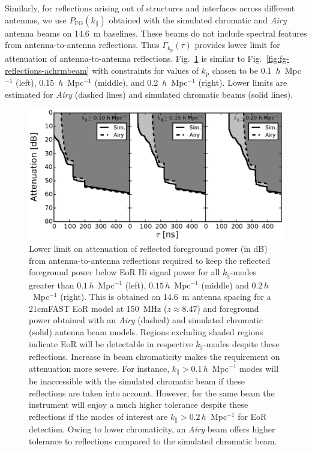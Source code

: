 \documentclass[preprint2,iop,numberedappendix,twocolappendix,appendixfloats]{emulateapj}
\begin{document}
Similarly, for reflections arising out of structures and interfaces across different antennas, we use $P_\textrm{FG}(k_\parallel)$ obtained with the simulated chromatic and {\it Airy} antenna beams on 14.6~m baselines. These beams do not include spectral features from antenna-to-antenna reflections. Thus $\Gamma_{k_\textrm{p}}(\tau)$ provides lower limit for attenuation of antenna-to-antenna reflections. Fig.~\ref{fig:fg-reflections} is similar to Fig.~\ref{fig:fg-reflections-achrmbeam} with constraints for values of $k_\textrm{p}$ chosen to be 0.1~$h$~Mpc$^{-1}$ (left), 0.15~$h$~Mpc$^{-1}$ (middle), and 0.2~$h$~Mpc$^{-1}$ (right). Lower limits are estimated for {\it Airy} (dashed lines) and simulated chromatic beams (solid lines).

\begin{figure}[htb]
\centering
\includegraphics[width=\linewidth]{spec_on_foreground_reflected_power_21cmfast_14.6m_150.0_MHz_subband_v2.eps}
\caption{Lower limit on attenuation of reflected foreground power (in dB) from antenna-to-antenna reflections required to keep the reflected foreground power below EoR H{\sc i} signal power for all $k_\parallel$-modes greater than $0.1\,h$~Mpc$^{-1}$ (left), $0.15\,h$~Mpc$^{-1}$ (middle) and $0.2\,h$~Mpc$^{-1}$ (right). This is obtained on 14.6~m antenna spacing for a 21cmFAST EoR model at 150~MHz ($z\approx 8.47$) and foreground power obtained with an {\it Airy} (dashed) and simulated chromatic (solid) antenna beam models. Regions excluding shaded regions indicate EoR will be detectable in respective $k_\parallel$-modes despite these reflections. Increase in beam chromaticity makes the requirement on attenuation more severe. For instance, $k_\parallel > 0.1\,h$~Mpc$^{-1}$ modes will be inaccessible with the simulated chromatic beam if these reflections are taken into account. However, for the same beam the instrument will enjoy a much higher tolerance despite these reflections if the modes of interest are $k_\parallel > 0.2\,h$~Mpc$^{-1}$ for EoR detection. Owing to lower chromaticity, an {\it Airy} beam offers higher tolerance to reflections compared to the simulated chromatic beam.}
\label{fig:fg-reflections}
\end{figure}
\end{document}
